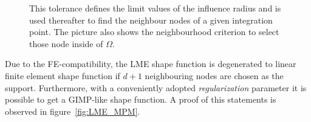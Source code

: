 \begin{figure}\sidecaption
  \centering
  \caption{This tolerance defines the limit values of the influence
    radius and is used thereafter to find the neighbour nodes of a
    given integration point. The picture also shows the neighbourhood
    criterion to select those node inside of $\Omega$.} 
  \label{fig:Particle-discretization}
\end{figure}
Due to the FE-compatibility, the LME shape function is degenerated to
linear finite element shape function if $d+1$ neighbouring nodes are
chosen as the support. Furthermore, with a conveniently adopted
\textit{regularization} parameter it is possible to get a GIMP-like
shape function. A proof of this statements is observed in figure~\ref{fig:LME_MPM}.  
